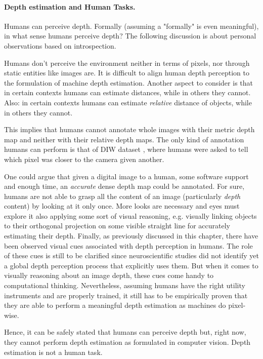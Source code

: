 \vfill

\paragraph{Depth estimation and Human Tasks.}
Humans can perceive depth.
Formally (assuming a "formally" is even meaningful), in what sense humans perceive depth?
The following discussion is about personal observations based on introspection.

Humans don't perceive the environment neither in terms of pixels, nor through static entities like images are.
It is difficult to align human depth perception to the formulation of machine depth estimation.
Another aspect to consider is that in certain contexts humans can estimate distances, while in others they cannot.
Also: in certain contexts humans can estimate \textit{relative} distance of objects, while in others they cannot.

This implies that humans cannot annotate whole images with their metric depth map and neither with their relative depth maps.
The only kind of annotation humans can perform is that of DIW dataset \cite{DIW}, where humans were asked to tell which pixel was closer to the camera given another.

One could argue that given a digital image to a human, some software support and enough time, an \textit{accurate} dense depth map could be annotated.
For sure, humans are not able to grasp all the content of an image (particularly \textit{depth} content) by looking at it only once.
More looks are necessary and eyes must explore it also applying some sort of visual reasoning, e.g. visually linking objects to their orthogonal projection on some visible straight line for accurately estimating their depth.
Finally, as previously discussed in this chapter, there have been observed visual cues associated with depth perception in humans.
The role of these cues is still to be clarified since neuroscientific studies did not identify yet a global depth perception process that explicitly uses them.
But when it comes to visually reasoning about an image depth, these cues come handy to computational thinking. 
Nevertheless, assuming humans have the right utility instruments and are properly trained, it still has to be empirically proven that they are able to perform a meaningful depth estimation as machines do pixel-wise.

Hence, it can be safely stated that humans can perceive depth but, right now, they cannot perform depth estimation as formulated in computer vision.
Depth estimation is not a human task.

